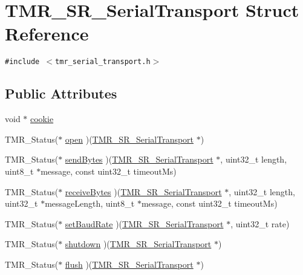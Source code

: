 \hypertarget{struct_t_m_r___s_r___serial_transport}{
\section{TMR\_\-SR\_\-SerialTransport Struct Reference}
\label{struct_t_m_r___s_r___serial_transport}
}
{\tt \#include $<$tmr\_\-serial\_\-transport.h$>$}

\subsection*{Public Attributes}
\begin{CompactItemize}
\item 
void $\ast$ \hyperlink{struct_t_m_r___s_r___serial_transport_754fb99a45265def1f13043bf0d05420}{cookie}
\item 
TMR\_\-Status($\ast$ \hyperlink{struct_t_m_r___s_r___serial_transport_4971afd7c8e756b6a0ebb92a4a1997ac}{open} )(\hyperlink{struct_t_m_r___s_r___serial_transport}{TMR\_\-SR\_\-SerialTransport} $\ast$)
\item 
TMR\_\-Status($\ast$ \hyperlink{struct_t_m_r___s_r___serial_transport_ae7f9dd7899fc5ca98baccac4dbc2215}{sendBytes} )(\hyperlink{struct_t_m_r___s_r___serial_transport}{TMR\_\-SR\_\-SerialTransport} $\ast$, uint32\_\-t length, uint8\_\-t $\ast$message, const uint32\_\-t timeoutMs)
\item 
TMR\_\-Status($\ast$ \hyperlink{struct_t_m_r___s_r___serial_transport_8998fa4c7b87786dbd5814d6c4ae5c94}{receiveBytes} )(\hyperlink{struct_t_m_r___s_r___serial_transport}{TMR\_\-SR\_\-SerialTransport} $\ast$, uint32\_\-t length, uint32\_\-t $\ast$messageLength, uint8\_\-t $\ast$message, const uint32\_\-t timeoutMs)
\item 
TMR\_\-Status($\ast$ \hyperlink{struct_t_m_r___s_r___serial_transport_fbaedbe9dec17295573159bcaaaebd4c}{setBaudRate} )(\hyperlink{struct_t_m_r___s_r___serial_transport}{TMR\_\-SR\_\-SerialTransport} $\ast$, uint32\_\-t rate)
\item 
TMR\_\-Status($\ast$ \hyperlink{struct_t_m_r___s_r___serial_transport_bf0146612ec589af32e732200c8fc998}{shutdown} )(\hyperlink{struct_t_m_r___s_r___serial_transport}{TMR\_\-SR\_\-SerialTransport} $\ast$)
\item 
TMR\_\-Status($\ast$ \hyperlink{struct_t_m_r___s_r___serial_transport_967a2ce35f57a99c0630adabd8b54a4e}{flush} )(\hyperlink{struct_t_m_r___s_r___serial_transport}{TMR\_\-SR\_\-SerialTransport} $\ast$)
\end{CompactItemize}


